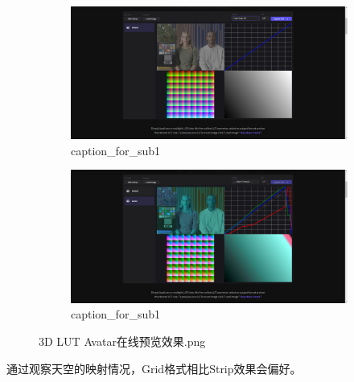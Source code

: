 \documentclass{ctexart}
\begin{document}
    \begin{figure}[!htbp]
    	\centering
    	\begin{subfigure}{0.49\textwidth}
    		\includegraphics[width=\textwidth]{color.io_lut_converter_default.png}
    		\caption{caption\_for\_sub1}
    	\end{subfigure}
    	\begin{subfigure}{0.49\textwidth}
    		\includegraphics[width=\textwidth]{color.io_lut_converter_avatar.png}
    		\caption{caption\_for\_sub1}
    	\end{subfigure}      
    	\caption{3D LUT Avatar在线预览效果.png}
    \end{figure}
    通过观察天空的映射情况，Grid格式相比Strip效果会偏好。
\end{document}
